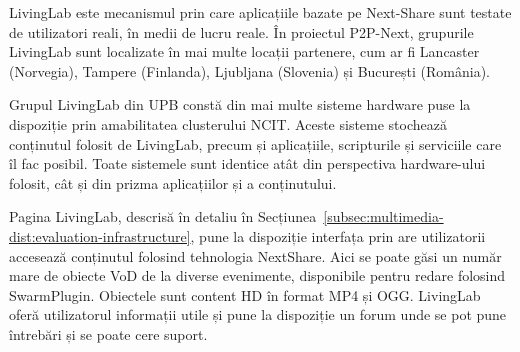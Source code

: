 LivingLab este mecanismul prin care aplicațiile bazate pe Next-Share sunt
testate de utilizatori reali, în medii de lucru reale. În proiectul P2P-Next,
grupurile LivingLab sunt localizate în mai multe locații partenere, cum ar fi
Lancaster (Norvegia), Tampere (Finlanda), Ljubljana (Slovenia) și București
(România).


Grupul LivingLab din UPB constă din mai multe sisteme hardware puse la
dispoziție prin amabilitatea clusterului NCIT. Aceste sisteme stochează
conținutul folosit de LivingLab, precum și aplicațiile, scripturile și
serviciile care îl fac posibil. Toate sistemele sunt identice atât din
perspectiva hardware-ului folosit, cât și din prizma aplicațiilor și a
conținutului.

Pagina LivingLab, descrisă în detaliu în 
Secțiunea~\ref{subsec:multimedia-dist:evaluation-infrastructure}, pune la
dispoziție interfața prin are utilizatorii accesează conținutul folosind
tehnologia NextShare. Aici se poate găsi un număr mare de obiecte VoD de la
diverse evenimente, disponibile pentru redare folosind SwarmPlugin. Obiectele
sunt content HD în format MP4 și OGG. LivingLab oferă utilizatorul informații
utile și pune la dispoziție un forum unde se pot pune întrebări și se poate
cere suport.

